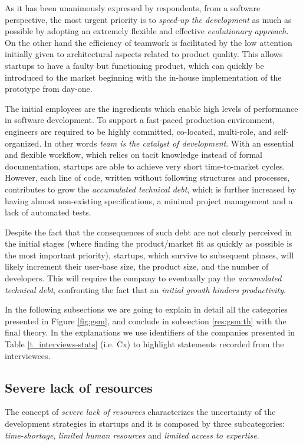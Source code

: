 \documentclass[10pt,journal,letterpaper,compsoc]{IEEEtran}
\begin{document}
As it has been unanimously expressed by respondents, from a software perspective, the most urgent priority is to \textit{speed-up the development} as much as possible by adopting an extremely flexible and effective \textit{evolutionary approach}. On the other hand the efficiency of teamwork is facilitated by the low attention initially given to architectural aspects related to product quality. This allows startups to have a faulty but functioning product, which can quickly be introduced to the market beginning with the in-house implementation of the prototype from day-one.

The initial employees are the ingredients which enable high levels of performance in software development. To support a fast-paced production environment, engineers are required to be highly committed, co-located, multi-role, and self-organized. In other words \textit{team is the catalyst of development}.
With an essential and flexible workflow, which relies on tacit knowledge instead of formal documentation, startups are able to achieve very short time-to-market cycles. However, each line of code, written without following structures and processes, contributes to grow the \textit{accumulated technical debt}, which is further increased by having almost non-existing specifications, a minimal project management and a lack of automated tests.

Despite the fact that the consequences of such debt are not clearly perceived in the initial stages (where finding the product/market fit as quickly as possible is the most important priority), startups, which survive to subsequent phases, will likely increment their user-base size, the product size, and the number of developers. This will require the company to eventually pay the \textit{accumulated technical debt}, confronting the fact that an \textit{initial growth hinders productivity}.

In the following subsections we are going to explain in detail all the categories presented in Figure \ref{fig:gsm}, and conclude in subsection \ref{res:gsm:th} with the final theory. In the explanations we use identifiers of the companies presented in Table \ref{t_interviews-stats} (i.e. Cx) to highlight statements recorded from the interviewees.

\subsection{Severe lack of resources}
\label{res:gsm:cat7}
The concept of \textit{severe lack of resources} characterizes the uncertainty of the development strategies in startups and it is composed by three subcategories: \textit{time-shortage}, \textit{limited human resources} and \textit{limited access to expertise}.
\end{document}
